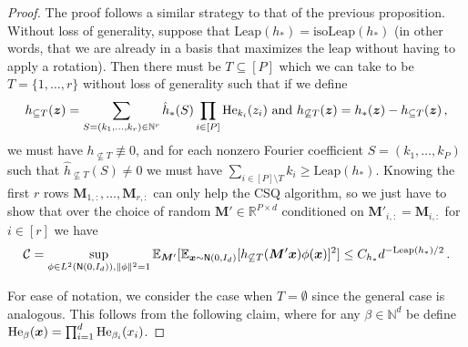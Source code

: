 \documentclass[11pt]{article}
\newcommand{\E}{\mathbb{E}}
\newcommand{\R}{\mathbb{R}}
\newcommand{\N}{\mathbb{N}}
\newcommand{\<}{\langle}
\renewcommand{\>}{\rangle}
\theoremstyle{definition}
\def\bM{{\boldsymbol M}}
\def\bx{{\boldsymbol x}}
\def\bz{{\boldsymbol z}}
\def\cC{{\mathcal C}}
\def\normal{{\sf N}}
\def\normal{{\sf N}}
\def\normal{{\sf N}}
\def\bz{{\boldsymbol z}}
\def\He{{\rm He}}
\def\bx{{\boldsymbol x}}
\def\bz{{\boldsymbol z}}
\def\He{{\rm He}}
\def\normal{{\sf N}}
\def\cC{\mathcal{C}}
\def\Leap{\mathrm{Leap}}
\begin{document}
\begin{proof}
The proof follows a similar strategy to that of the previous proposition. Without loss of generality, suppose that $\Leap(h_*) = \mathrm{isoLeap}(h_*)$ (in other words, that we are already in a basis that maximizes the leap without having to apply a rotation). Then there must be $T \subseteq [P]$ which we can take to be $T = \{1,\ldots,r\}$ without loss of generality such that if we define
\begin{align*}h_{\subseteq T}(\bz) = \sum_{S = (k_1,\ldots,k_r) \in \N^r} \hat{h}_*(S) \prod_{i \in [P]} \He_{k_i}(z_i) \mbox{ and } h_{\not\subseteq T}(\bz) = h_*(\bz) - h_{\subseteq T}(\bz)\,,
\end{align*}
we must have $h_{\not\subseteq T} \not\equiv 0$, and for each nonzero Fourier coefficient $S = (k_1,\ldots,k_P)$ such that $\hat{h}_{\not\subseteq T}(S) \neq 0$ we must have $\sum_{i \in [P] \setminus T} k_i \geq \Leap(h_*)$. Knowing the first $r$ rows $\bM_{1,:},\ldots,\bM_{r,:}$ can only help the CSQ algorithm, so we just have to show that over the choice of random $\bM' \in \R^{P \times d}$ conditioned on $\bM'_{i,:} = \bM_{i,:}$ for $i \in [r]$ we have
\begin{align*}
\cC = \sup_{\phi \in L^2(\normal(0,I_d)), \|\phi\|^2 = 1} \E_{\bM'}[\E_{\bx \sim \normal(0,I_d)}[h_{\not\subseteq T}(\bM' \bx) \phi(\bx)]^2] \leq C_{h_*} d^{-\Leap(h_*) / 2}\,.
\end{align*}

For ease of notation, we consider the case when $T = \emptyset$ since the general case is analogous. This follows from the following claim, where for any $\beta \in \N^d$ be define $\He_{\beta}(\bx) = \prod_{i=1}^d \He_{\beta_i}(x_i)$.


\end{proof}
\end{document}
